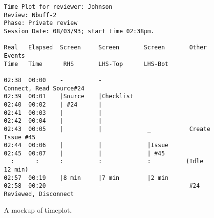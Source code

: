 \begin{figure}                                        
\small
\begin{verbatim}
Time Plot for reviewer: Johnson
Review: Nbuff-2
Phase: Private review
Session Date: 08/03/93; start time 02:38pm.

Real   Elapsed  Screen     Screen       Screen       Other Events
Time   Time      RHS       LHS-Top      LHS-Bot

02:38  00:00    -          -                         Connect, Read Source#24
02:39  00:01    |Source    |Checklist  
02:40  00:02    | #24      |  
02:41  00:03    |          | 
02:42  00:04    |          |
02:43  00:05    |          |             _           Create Issue #45
02:44  00:06    |          |             |Issue
02:45  00:07    |          |             | #45     
  :      :      :          :             :          (Idle 12 min)
02:57  00:19    |8 min     |7 min        |2 min
02:58  00:20    -          -             -           #24 Reviewed, Disconnect
\end{verbatim}
\normalsize
\caption{A mockup of timeplot.}
\label{fig:timeplot}
\end{figure}






